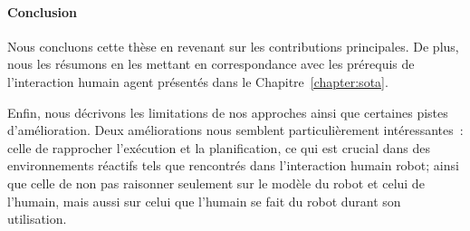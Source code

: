 \paragraph{Conclusion}
Nous concluons cette thèse en revenant sur les contributions principales. De plus, nous les résumons en les mettant en correspondance avec les prérequis de l'interaction humain agent présentés dans le Chapitre~\ref{chapter:sota}.

Enfin, nous décrivons les limitations de nos approches ainsi que certaines pistes d'amélioration. Deux améliorations nous semblent particulièrement intéressantes~: celle de rapprocher l’exécution et la planification, ce qui est crucial dans des environnements réactifs tels que rencontrés dans l'interaction humain robot; ainsi que celle de non pas raisonner seulement sur le modèle du robot et celui de l'humain, mais aussi sur celui que l'humain se fait du robot durant son utilisation.


